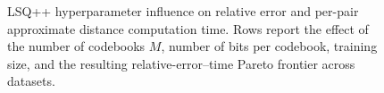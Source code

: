 \documentclass[sigconf]{acmart}
\begin{document}
\begin{figure}[t]
\par\medskip

\hfill
{}\hfill
{}\hfill
{}\hfill
{}

\caption{LSQ++ hyperparameter influence on relative error and per-pair approximate distance computation time. Rows report the effect of the number of codebooks $M$, number of bits per codebook, training size, and the resulting relative-error--time Pareto frontier across datasets.}
\label{fig:lsqpp_hp_inf}
\end{figure}







\end{document}
